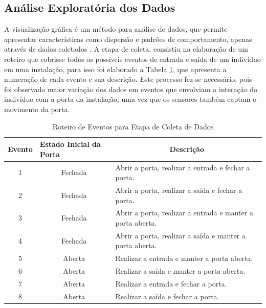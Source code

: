 \subsection{Análise Exploratória dos Dados}
\label{subsec:exploratory_data_analysis}

A visualização gráfica é um método para análise de dados, que permite apresentar características como dispersão e padrões de comportamento, apenas através de dados coletados \cite{wohlin2012experimentation}. A etapa de coleta, consistiu na elaboração de um roteiro que cobrisse todos os possíveis eventos de entrada e saída de um indivíduo em uma instalação, para isso foi elaborado a Tabela \ref{tab:events_description}, que apresenta a numeração de cada evento e sua descrição. Este processo fez-se necessário, pois foi observado maior variação dos dados em eventos que envolviam a interação do indivíduo com a porta da instalação, uma vez que os sensores também captam o movimento da porta.

\renewcommand{\arraystretch}{1.3}
\begin{table}[H]
	\centering
	\caption{Roteiro de Eventos para Etapa de Coleta de Dados}
	\label{tab:events_description}
	\begin{tabular}{|c|c|l|}
		\hline
		\multicolumn{1}{|l|}{\textbf{Evento}} & \multicolumn{1}{l|}{\textbf{Estado Inicial da Porta}} & \multicolumn{1}{c|}{\textbf{Descrição}}                    \\ \hline
		1                                     & Fechada                                               & Abrir a porta, realizar a entrada e fechar a porta.        \\
		2                                     & Fechada                                               & Abrir a porta, realizar a saída e fechar a porta.          \\
		3                                     & Fechada                                               & Abrir a porta, realizar a entrada e manter a porta aberta. \\
		4                                     & Fechada                                               & Abrir a porta, realizar a saída e manter a porta aberta.   \\
		5                                     & Aberta                                                & Realizar a entrada e manter a porta aberta.                \\
		6                                     & Aberta                                                & Realizar a saída e manter a porta aberta.                  \\
		7                                     & Aberta                                                & Realizar a entrada e fechar a porta.                       \\
		8                                     & Aberta                                                & Realizar a saída e fechar a porta.                         \\ \hline
	\end{tabular}
\end{table}

